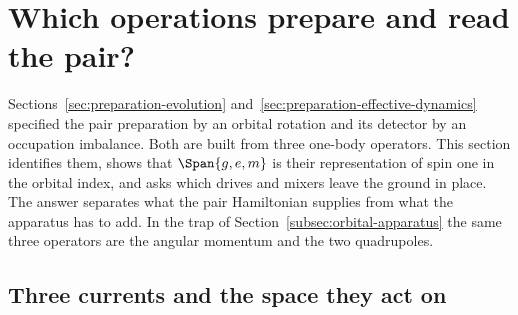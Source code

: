 \section{Which operations prepare and read the pair?}
\label{sec:pair-currents}

Sections~\ref{sec:preparation-evolution} and~\ref{sec:preparation-effective-dynamics} specified the pair preparation by an orbital rotation and its detector by an occupation imbalance. Both are built from three one-body operators. This section identifies them, shows that $\Span\{g,e,m\}$ is their representation of spin one in the orbital index, and asks which drives and mixers leave the ground in place. The answer separates what the pair Hamiltonian supplies from what the apparatus has to add. In the trap of Section~\ref{subsec:orbital-apparatus} the same three operators are the angular momentum and the two quadrupoles.

\subsection{Three currents and the space they act on}
\label{subsec:pair-currents-triplet}


